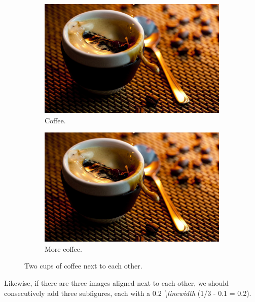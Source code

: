 \documentclass[11pt]{article}  %
\begin{document}
      \begin{figure}[h!]
        \centering
        \begin{subfigure}[h]{0.4\linewidth}  %
          \includegraphics[width=\linewidth]{support/coffee.jpg}
          \caption{Coffee.}
        \end{subfigure}
        \begin{subfigure}[h]{0.4\linewidth}  %
          \includegraphics[width=\linewidth]{support/coffee.jpg}
          \caption{More coffee.}
        \end{subfigure}
        \caption{Two cups of coffee next to each other.}
        \label{f2}
      \end{figure}

      Likewise, if there are three images aligned next to each other, we should consecutively add three subfigures, each with a 0.2 \textit{\textbackslash linewidth} (1/3 - 0.1 = 0.2).
\end{document}
